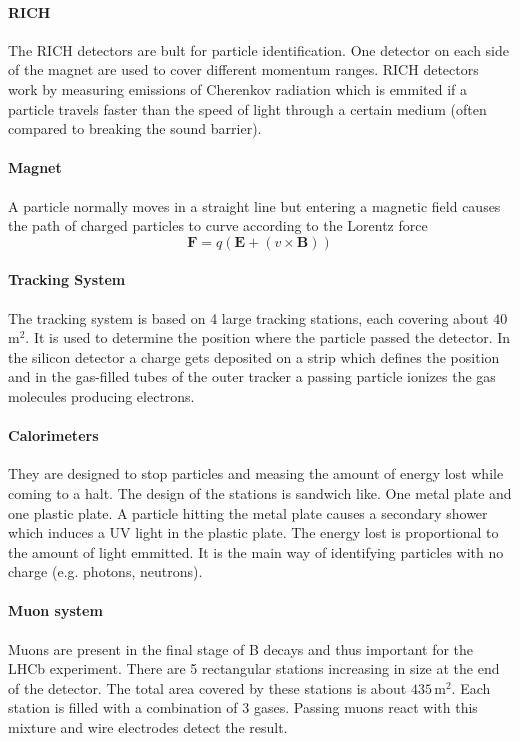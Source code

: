 \documentclass[10pt,twoside]{scrreprt}
\begin{document}
\paragraph{RICH} The RICH detectors are bult for particle identification. One detector on each side of the magnet are used to cover different momentum ranges. RICH detectors work by measuring emissions of Cherenkov radiation which is emmited if a particle travels faster than the speed of light through a certain medium (often compared to breaking the sound barrier).

\paragraph{Magnet} A particle normally moves in a straight line but entering a magnetic field causes the path of charged particles to curve according to the Lorentz force \[
  \mathbf{F} = q\left( \mathbf{E} + \left( v\times\mathbf{B}\right)\right)
\]

\paragraph{Tracking System} The tracking system is based on 4 large tracking stations, each covering about $40$\,m$^2$. It is used to determine the position where the particle passed the detector. In the silicon detector a charge gets deposited on a strip which defines the position and in the gas-filled tubes of the outer tracker a passing particle ionizes the gas molecules producing electrons.

\paragraph{Calorimeters} They are designed to stop particles and measing the amount of energy lost while coming to a halt. The design of the stations is sandwich like. One metal plate and one plastic plate. A particle hitting the metal plate causes a secondary shower which induces a UV light in the plastic plate. The energy lost is proportional to the amount of light emmitted. It is the main way of identifying particles with no charge (e.g. photons, neutrons).

\paragraph{Muon system}
Muons are present in the final stage of B decays and thus important for the LHCb experiment. There are 5 rectangular stations increasing in size at the end of the detector. The total area covered by these stations is about $435$\,m$^2$. Each station is filled with a combination of 3 gases. Passing muons react with this mixture and wire electrodes detect the result.
\end{document}
